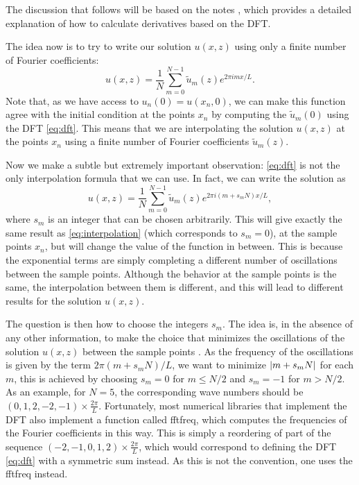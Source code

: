 \documentclass[a4paper,10pt]{report}
\begin{document}
The discussion that follows will be based on the notes \cite{fftderiv}, which provides a detailed explanation of how to calculate derivatives based on the DFT.

The idea now is to try to write our solution $u(x,z)$ using only a finite number of Fourier coefficients:
\begin{equation}
\label{eq:interpolation}
    u(x,z) = \frac{1}{N}\sum_{m=0}^{N-1} \tilde{u}_m(z) e^{2\pi i m x/L}.
\end{equation}
Note that, as we have access to $u_n(0) = u(x_n, 0)$, we can make this function agree with the initial condition at the points $x_n$ by computing the $\tilde{u}_m(0)$ using the DFT \eqref{eq:dft}. This means that we are interpolating the solution $u(x,z)$ at the points $x_n$ using a finite number of Fourier coefficients $\tilde{u}_m(z)$.

Now we make a subtle but extremely important observation: \eqref{eq:dft} is not the only interpolation formula that we can use. In fact, we can write the solution as
\begin{equation}
\label{eq:interpolation2}
    u(x,z) = \frac{1}{N}\sum_{m=0}^{N-1} \tilde{u}_m(z) e^{2\pi i (m + s_m N) x/L},
\end{equation}
where $s_m$ is an integer that can be chosen arbitrarily. This will give exactly the same result as \eqref{eq:interpolation} (which corresponds to $s_m = 0$), at the sample points $x_n$, but will change the value of the function in between. This is because the exponential terms are simply completing a different number of oscillations between the sample points. Although the behavior at the sample points is the same, the interpolation between them is different, and this will lead to different results for the solution $u(x,z)$.

The question is then how to choose the integers $s_m$. The idea is, in the absence of any other information, to make the choice that minimizes the oscillations of the solution $u(x,z)$ between the sample points \cite{fftderiv}. As the frequency of the oscillations is given by the term $2\pi (m + s_m N) / L$, we want to minimize $\abs{m + s_m N}$ for each $m$, this is achieved by choosing $s_m = 0$ for $m \le N/2$ and $s_m = -1$ for $m > N/2$. As an example, for $N = 5$, the corresponding wave numbers should be $(0, 1, 2, -2, -1) \times \frac{2\pi}{L}$. Fortunately, most numerical libraries that implement the DFT also implement a function called fftfreq, which computes the frequencies of the Fourier coefficients in this way. This is simply a reordering of part of the sequence $(-2, -1, 0, 1, 2) \times \frac{2\pi}{L}$, which would correspond to defining the DFT \eqref{eq:dft} with a symmetric sum instead. As this is not the convention, one uses the fftfreq instead. 
\end{document}
